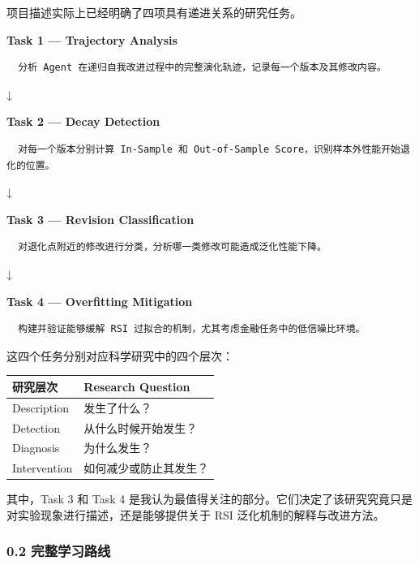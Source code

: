 项目描述实际上已经明确了四项具有递进关系的研究任务。

\textbf{Task 1 --- Trajectory Analysis}

\begin{verbatim}
  分析 Agent 在递归自我改进过程中的完整演化轨迹，记录每一个版本及其修改内容。
\end{verbatim}

↓

\textbf{Task 2 --- Decay Detection}

\begin{verbatim}
  对每一个版本分别计算 In-Sample 和 Out-of-Sample Score，识别样本外性能开始退化的位置。
\end{verbatim}

↓

\textbf{Task 3 --- Revision Classification}

\begin{verbatim}
  对退化点附近的修改进行分类，分析哪一类修改可能造成泛化性能下降。
\end{verbatim}

↓

\textbf{Task 4 --- Overfitting Mitigation}

\begin{verbatim}
  构建并验证能够缓解 RSI 过拟合的机制，尤其考虑金融任务中的低信噪比环境。
\end{verbatim}

这四个任务分别对应科学研究中的四个层次：

\begin{readertable}
\begin{longtable}[]{@{}
  >{\raggedright\arraybackslash}p{}
  >{\raggedright\arraybackslash}p{}@{}}
\toprule
研究层次 & Research Question \\
\midrule
\endhead
Description & 发生了什么？ \\
Detection & 从什么时候开始发生？ \\
Diagnosis & 为什么发生？ \\
Intervention & 如何减少或防止其发生？ \\
\bottomrule
\end{longtable}
\end{readertable}

其中，Task 3 和 Task 4 是我认为最值得关注的部分。它们决定了该研究究竟只是对实验现象进行描述，还是能够提供关于 RSI 泛化机制的解释与改进方法。

\hypertarget{part-1-07-0001-ux5b8cux6574ux5b66ux4e60ux8defux7ebf}{%
\subsubsection{0.2 完整学习路线}\label{part-1-07-0001-ux5b8cux6574ux5b66ux4e60ux8defux7ebf}}

